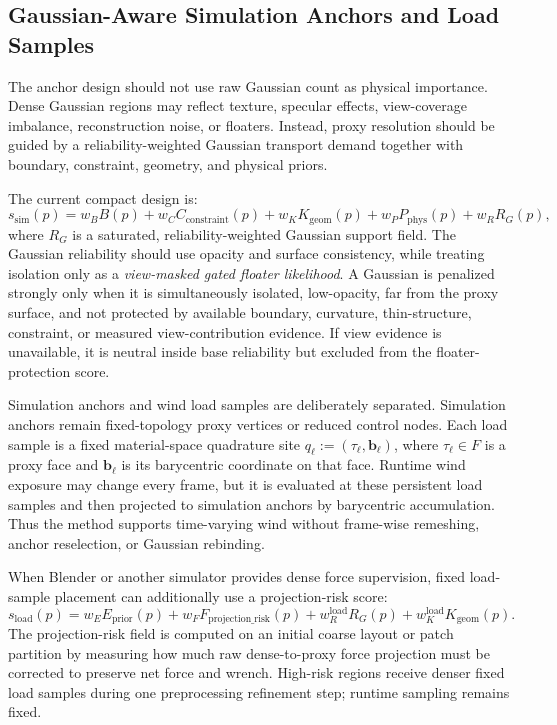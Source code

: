 \documentclass[11pt]{article}
\begin{document}
\subsection*{Gaussian-Aware Simulation Anchors and Load Samples}

The anchor design should not use raw Gaussian count as physical importance. Dense Gaussian regions may reflect texture, specular effects, view-coverage imbalance, reconstruction noise, or floaters. Instead, proxy resolution should be guided by a reliability-weighted Gaussian transport demand together with boundary, constraint, geometry, and physical priors.

The current compact design is:
\[
  s_{\mathrm{sim}}(p)
  =
  w_B B(p)
  +
  w_C C_{\mathrm{constraint}}(p)
  +
  w_K K_{\mathrm{geom}}(p)
  +
  w_P P_{\mathrm{phys}}(p)
  +
  w_R R_G(p),
\]
where \(R_G\) is a saturated, reliability-weighted Gaussian support field. The Gaussian reliability should use opacity and surface consistency, while treating isolation only as a \emph{view-masked gated floater likelihood}. A Gaussian is penalized strongly only when it is simultaneously isolated, low-opacity, far from the proxy surface, and not protected by available boundary, curvature, thin-structure, constraint, or measured view-contribution evidence. If view evidence is unavailable, it is neutral inside base reliability but excluded from the floater-protection score.

Simulation anchors and wind load samples are deliberately separated. Simulation anchors remain fixed-topology proxy vertices or reduced control nodes. Each load sample is a fixed material-space quadrature site \(q_\ell := (\tau_\ell,\mathbf{b}_\ell)\), where \(\tau_\ell\in F\) is a proxy face and \(\mathbf{b}_\ell\) is its barycentric coordinate on that face. Runtime wind exposure may change every frame, but it is evaluated at these persistent load samples and then projected to simulation anchors by barycentric accumulation. Thus the method supports time-varying wind without frame-wise remeshing, anchor reselection, or Gaussian rebinding.

When Blender or another simulator provides dense force supervision, fixed load-sample placement can additionally use a projection-risk score:
\[
  s_{\mathrm{load}}(p)
  =
  w_E E_{\mathrm{prior}}(p)
  +
  w_F F_{\mathrm{projection\_risk}}(p)
  +
  w_R^{\mathrm{load}}R_G(p)
  +
  w_K^{\mathrm{load}}K_{\mathrm{geom}}(p).
\]
The projection-risk field is computed on an initial coarse layout or patch partition by measuring how much raw dense-to-proxy force projection must be corrected to preserve net force and wrench. High-risk regions receive denser fixed load samples during one preprocessing refinement step; runtime sampling remains fixed.
\end{document}
